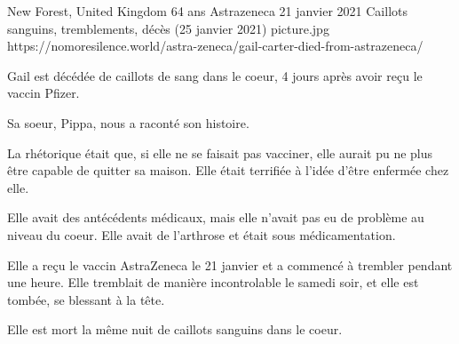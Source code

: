           {New Forest, United Kingdom}
          {64 ans}
          {Astrazeneca}
          {21 janvier 2021}
          {Caillots sanguins, tremblements, décès (25 janvier 2021)}
          {picture.jpg}
          {https://nomoresilence.world/astra-zeneca/gail-carter-died-from-astrazeneca/}
          {
            
Gail est décédée de caillots de sang dans le coeur, 4 jours après avoir reçu le
vaccin Pfizer.

Sa soeur, Pippa, nous a raconté son histoire.

La rhétorique était que, si elle ne se faisait pas vacciner, elle aurait pu ne
plus être capable de quitter sa maison. Elle était terrifiée à l'idée d'être
enfermée chez elle.

Elle avait des antécédents médicaux, mais elle n'avait pas eu de problème au
niveau du coeur. Elle avait de l'arthrose et était sous médicamentation.

Elle a reçu le vaccin AstraZeneca le 21 janvier et a commencé à trembler pendant
une heure. Elle tremblait de manière incontrolable le samedi soir, et elle est
tombée, se blessant à la tête.

Elle est mort la même nuit de caillots sanguins dans le coeur.

}
